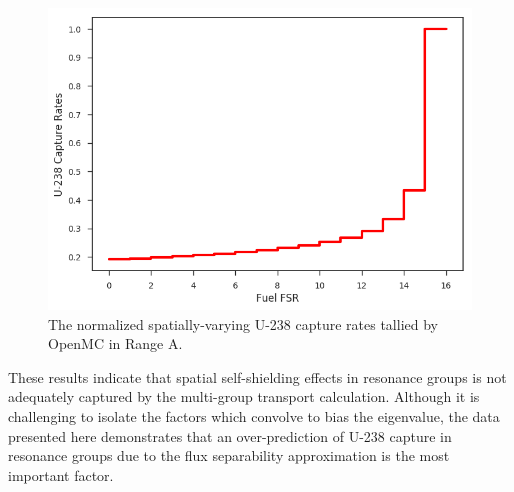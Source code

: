 \begin{figure}[h!]
\centering
\includegraphics[width=\linewidth]{figures/u238-capt-rates-fuel-fsrs}
\caption{The normalized spatially-varying U-238 capture rates tallied by OpenMC in Range A.}
\label{fig:u238-capture-space}
\end{figure}

These results indicate that spatial self-shielding effects in resonance groups is not adequately captured by the multi-group transport calculation. Although it is challenging to isolate the factors which convolve to bias the eigenvalue, the data presented here demonstrates that an over-prediction of U-238 capture in resonance groups due to the flux separability approximation is the most important factor.
